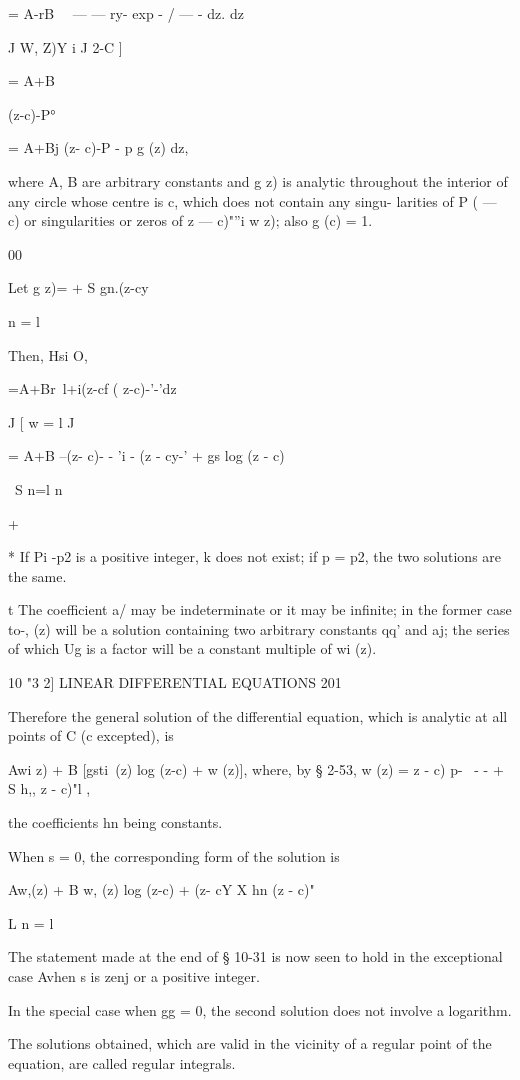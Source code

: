  = A-rB\ ~ — — ry- exp - / — - dz. dz

J W, Z)Y i J 2-C ]

= A+B

(z-c)-P°

= A+Bj (z- c)-P - p g (z) dz,

where A, B are arbitrary constants and g z) is analytic throughout the
interior of any circle whose centre is c, which does not contain any
singu- larities of P ( — c) or singularities or zeros of z — c)"''i w
z); also g (c) = 1.

00

Let g z)= + S gn.(z-cy\

n = l

Then, Hsi O,

 =A+Br\ l+i(z-cf ( z-c)-'-'dz

J [ w = l J

= A+B --(z- c)- - 'i - (z - cy-' + gs log (z - c)

\ S n=l n

+ %

* If Pi -p2 is a positive integer, k does not exist; if p = p2, the
two solutions are the same.

t The coefficient a/ may be indeterminate or it may be infinite; in
the former case to-, (z) will be a solution containing two arbitrary
constants qq' and aj; the series of which Ug is a factor will be a
constant multiple of wi (z).

10 "3 2] LINEAR DIFFERENTIAL EQUATIONS 201

Therefore the general solution of the differential equation, which is
analytic at all points of C (c excepted), is

Awi z) + B [gsti\ (z) log (z-c) + w (z)], where, by § 2-53, w (z) = z
- c) p- \ - - + S h,, z - c)"l ,

the coefficients hn being constants.

When s = 0, the corresponding form of the solution is

Aw,(z) + B w, (z) log (z-c) + (z- cY X hn (z - c)"

L n = l \

The statement made at the end of § 10-31 is now seen to hold in the
exceptional case Avhen s is zenj or a positive integer.

In the special case when gg = 0, the second solution does not involve
a logarithm.

The solutions obtained, which are valid in the vicinity of a regular
point of the equation, are called regular integrals.

